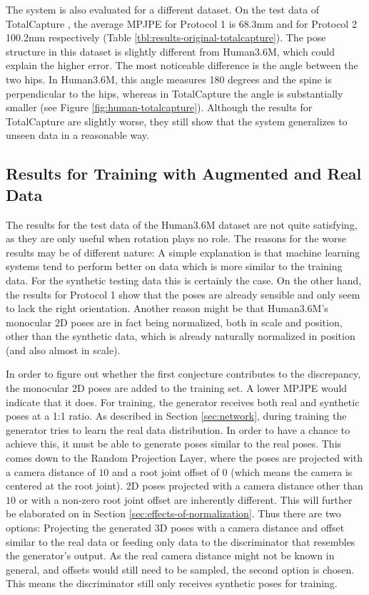 The system is also evaluated for a different dataset.
On the test data of TotalCapture \cite{trumble17}, the average MPJPE for Protocol 1 is 68.3mm and for Protocol 2 100.2mm respectively (Table \ref{tbl:results-original-totalcapture}).
The pose structure in this dataset is slightly different from Human3.6M, which could explain the higher error.
The most noticeable difference is the angle between the two hips.
In Human3.6M, this angle measures 180 degrees and the spine is perpendicular to the hips, whereas in TotalCapture the angle is substantially smaller (see Figure \ref{fig:human-totalcapture}).
Although the results for TotalCapture are slightly worse, they still show that the system generalizes to unseen data in a reasonable way.




\subsection{Results for Training with Augmented and Real Data}
\label{sec:results-augmented}
The results for the test data of the Human3.6M dataset are not quite satisfying, as they are only useful when rotation plays no role.
The reasons for the worse results may be of different nature:
A simple explanation is that machine learning systems tend to perform better on data which is more similar to the training data.
For the synthetic testing data this is certainly the case.
On the other hand, the results for Protocol 1 show that the poses are already sensible and only seem to lack the right orientation.
Another reason might be that Human3.6M's monocular 2D poses are in fact being normalized, both in scale and position, other than the synthetic data, which is already naturally normalized in position (and also almost in scale).

In order to figure out whether the first conjecture contributes to the discrepancy, the monocular 2D poses are added to the training set.
A lower MPJPE would indicate that it does.
For training, the generator receives both real and synthetic poses at a 1:1 ratio.
As described in Section \ref{sec:network}, during training the generator tries to learn the real data distribution.
In order to have a chance to achieve this, it must be able to generate poses similar to the real poses. 
This comes down to the Random Projection Layer, where the poses are projected with a camera distance of $10$ and a root joint offset of $0$ (which means the camera is centered at the root joint).
2D poses projected with a camera distance other than $10$ or with a non-zero root joint offset are inherently different.
This will further be elaborated on in Section \ref{sec:effects-of-normalization}.
Thus there are two options:
Projecting the generated 3D poses with a camera distance and offset similar to the real data or feeding only data to the discriminator that resembles the generator's output.
As the real camera distance might not be known in general, and offsets would still need to be sampled, the second option is chosen.
This means the discriminator still only receives synthetic poses for training.

